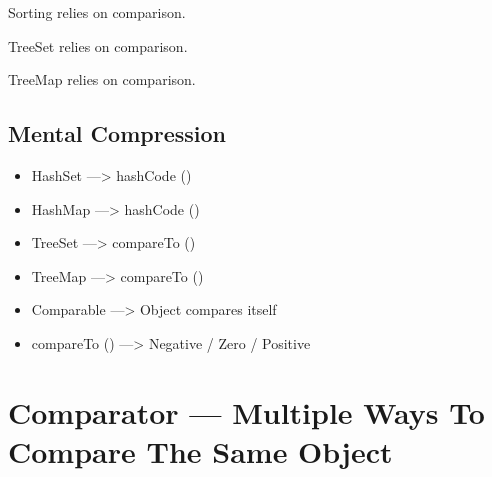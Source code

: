 \documentclass[11pt,a4paper]{book}
\begin{document}

\begin{rosettarule}

Sorting relies on comparison.

\end{rosettarule}


\begin{rosettarule}

TreeSet relies on comparison.

\end{rosettarule}


\begin{rosettarule}

TreeMap relies on comparison.

\end{rosettarule}


\section{Mental Compression}
\begin{itemize}
\item HashSet ---> hashCode ()
\item HashMap ---> hashCode ()
\item TreeSet ---> compareTo ()
\item TreeMap ---> compareTo ()
\item Comparable ---> Object compares itself 
\item compareTo () ---> Negative / Zero / Positive
\end{itemize}

\chapter[Comparator]{Comparator --- Multiple Ways To Compare The Same Object}
\end{document}
